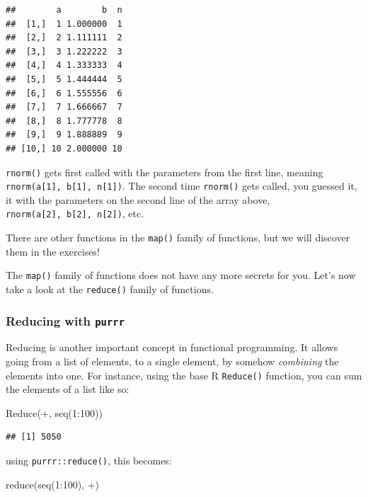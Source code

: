 \documentclass[
]{article}
\newenvironment{Shaded}{\begin{snugshade}}{\end{snugshade}}
\newcommand{\AttributeTok}[1]{\textcolor[rgb]{0.77,0.63,0.00}{#1}}
\newcommand{\DecValTok}[1]{\textcolor[rgb]{0.00,0.00,0.81}{#1}}
\newcommand{\FunctionTok}[1]{\textcolor[rgb]{0.00,0.00,0.00}{#1}}
\newcommand{\NormalTok}[1]{#1}
\newcommand{\SpecialCharTok}[1]{\textcolor[rgb]{0.00,0.00,0.00}{#1}}
\newcommand{\StringTok}[1]{\textcolor[rgb]{0.31,0.60,0.02}{#1}}
\begin{document}
\begin{verbatim}
##        a        b  n
##  [1,]  1 1.000000  1
##  [2,]  2 1.111111  2
##  [3,]  3 1.222222  3
##  [4,]  4 1.333333  4
##  [5,]  5 1.444444  5
##  [6,]  6 1.555556  6
##  [7,]  7 1.666667  7
##  [8,]  8 1.777778  8
##  [9,]  9 1.888889  9
## [10,] 10 2.000000 10
\end{verbatim}

\texttt{rnorm()} gets first called with the parameters from the first line, meaning
\texttt{rnorm(a{[}1{]},\ b{[}1{]},\ n{[}1{]})}. The second time \texttt{rnorm()} gets called, you guessed it,
it with the parameters on the second line of the array above,
\texttt{rnorm(a{[}2{]},\ b{[}2{]},\ n{[}2{]})}, etc.

There are other functions in the \texttt{map()} family of functions, but we will discover them in the
exercises!

The \texttt{map()} family of functions does not have any more secrets for you. Let's now take a look at
the \texttt{reduce()} family of functions.

\hypertarget{reducing-with-purrr}{%
\subsubsection{\texorpdfstring{Reducing with \texttt{purrr}}{Reducing with purrr}}\label{reducing-with-purrr}}

Reducing is another important concept in functional programming. It allows going from a list of
elements, to a single element, by somehow \emph{combining} the elements into one. For instance, using
the base R \texttt{Reduce()} function, you can sum the elements of a list like so:

\begin{Shaded}
\begin{Highlighting}[]
\FunctionTok{Reduce}\NormalTok{(}\StringTok{\textasciigrave{}}\AttributeTok{+}\StringTok{\textasciigrave{}}\NormalTok{, }\FunctionTok{seq}\NormalTok{(}\DecValTok{1}\SpecialCharTok{:}\DecValTok{100}\NormalTok{))}
\end{Highlighting}
\end{Shaded}

\begin{verbatim}
## [1] 5050
\end{verbatim}

using \texttt{purrr::reduce()}, this becomes:

\begin{Shaded}
\begin{Highlighting}[]
\FunctionTok{reduce}\NormalTok{(}\FunctionTok{seq}\NormalTok{(}\DecValTok{1}\SpecialCharTok{:}\DecValTok{100}\NormalTok{), }\StringTok{\textasciigrave{}}\AttributeTok{+}\StringTok{\textasciigrave{}}\NormalTok{)}
\end{Highlighting}
\end{Shaded}
\end{document}
